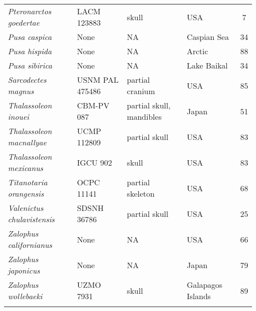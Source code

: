 \begin{longtable}{p{}p{}p{}lc}
\textit{Pteronarctos goedertae} &	LACM 123883 & 	skull & 	USA	 & 7\\
\textit{Pusa caspica} &	None & 	NA & 	Caspian Sea & 34\\
\textit{Pusa hispida} &	None & 	NA & 	Arctic & 88\\
\textit{Pusa sibirica} &	None & 	NA & 	Lake Baikal & 34\\
\textit{Sarcodectes magnus} &	USNM PAL 475486 & 	partial cranium & 	USA & 85\\
\textit{Thalassoleon inouei} &	CBM-PV 087 & 	partial skull, mandibles & 	Japan & 51\\
\textit{Thalassoleon macnallyae} &	UCMP 112809 & 	partial skull & 	USA & 83\\
\textit{Thalassoleon mexicanus} &	IGCU 902 & 	skull & 	USA & 83\\
\textit{Titanotaria orangensis} &	OCPC 11141 & 	partial skeleton & 	USA & 68\\
\textit{Valenictus chulavistensis} &	SDSNH 36786 & 	partial skull & 	USA & 25\\
\textit{Zalophus californianus} &	None & 	NA & 	USA	 & 66\\
\textit{Zalophus japonicus} &	None & 	NA & 	Japan & 79\\
\textit{Zalophus wollebaeki} &	UZMO 7931 & skull & 	Galapagos Islands & 89\\
\hline

\label{table-taxa}
\end{longtable}